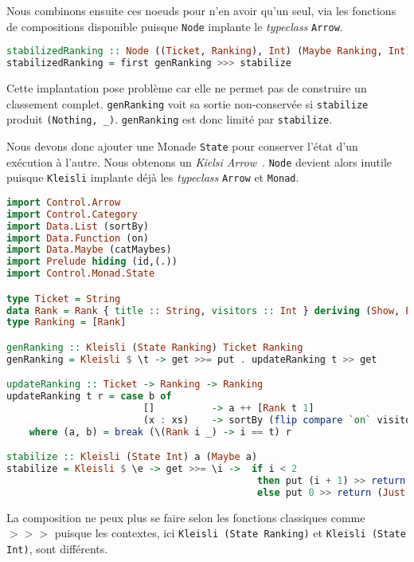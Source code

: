 \documentclass{llncs}
\begin{document}
Nous combinons ensuite ces noeuds pour n'en avoir qu'un seul, via les fonctions
de compositions disponible puisque \texttt{Node} implante le \emph{typeclass} \texttt{Arrow}.
\begin{lstlisting}[language=haskell]
stabilizedRanking :: Node ((Ticket, Ranking), Int) (Maybe Ranking, Int)
stabilizedRanking = first genRanking >>> stabilize
\end{lstlisting}

Cette implantation pose problème car elle ne permet pas de construire un classement
complet. \texttt{genRanking} voit sa sortie non-conservée si \texttt{stabilize}
produit \texttt{(Nothing, \_)}.
\texttt{genRanking} est donc limité par \texttt{stabilize}.

Nous devons donc ajouter une Monade \texttt{State} pour conserver l'état d'un exécution à l'autre.
Nous obtenons un \emph{Kielsi Arrow}~\cite{Hughes00}.
\texttt{Node} devient alors inutile puisque \texttt{Kleisli} implante déjà les
\emph{typeclass} \texttt{Arrow} et \texttt{Monad}.


\begin{lstlisting}[language=haskell]
import Control.Arrow
import Control.Category
import Data.List (sortBy)
import Data.Function (on)
import Data.Maybe (catMaybes)
import Prelude hiding (id,(.))
import Control.Monad.State

type Ticket = String
data Rank = Rank { title :: String, visitors :: Int } deriving (Show, Eq)
type Ranking = [Rank]

genRanking :: Kleisli (State Ranking) Ticket Ranking
genRanking = Kleisli $ \t -> get >>= put . updateRanking t >> get

updateRanking :: Ticket -> Ranking -> Ranking
updateRanking t r = case b of
                        []          -> a ++ [Rank t 1]
                        (x : xs)    -> sortBy (flip compare `on` visitors) (Rank t (1 + visitors x) : a ++ xs)
    where (a, b) = break (\(Rank i _) -> i == t) r

stabilize :: Kleisli (State Int) a (Maybe a)
stabilize = Kleisli $ \e -> get >>= \i ->  if i < 2
                                            then put (i + 1) >> return Nothing
                                            else put 0 >> return (Just e)
\end{lstlisting}

La composition ne peux plus se faire selon les fonctions classiques comme $>>>$
puisque les contextes, ici \texttt{Kleisli (State Ranking)} et \texttt{Kleisli (State Int)},
sont différents.
\end{document}
